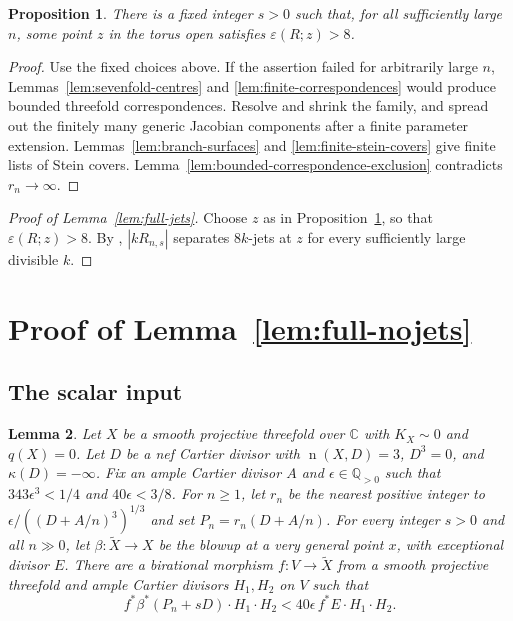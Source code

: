 \documentclass[12pt,a4paper,psamsfonts]{amsart}
\theoremstyle{definition}
\theoremstyle{plain}
\newtheorem{lemma}{Lemma}[section]
\newtheorem{proposition}[lemma]{Proposition}
\newcommand{\Q}{\mathbb Q}
\newcommand{\C}{\mathbb C}
\newcommand{\nef}{\operatorname{n}}
\begin{document}
\begin{proposition}\label{prop:sevenfold-jets}
There is a fixed integer $s>0$ such that, for all sufficiently
large $n$, some point $z$ in the torus open satisfies
$\varepsilon(R;z)>8$.
\end{proposition}
\begin{proof}
Use the fixed choices above. If the assertion failed for arbitrarily
large $n$, Lemmas~\ref{lem:sevenfold-centres} and
\ref{lem:finite-correspondences} would produce bounded threefold
correspondences. Resolve and shrink the family, and spread out
the finitely many generic Jacobian components after a finite
parameter extension. Lemmas~\ref{lem:branch-surfaces} and
\ref{lem:finite-stein-covers} give finite lists of Stein covers.
Lemma~\ref{lem:bounded-correspondence-exclusion} contradicts
$r_n\to\infty$.
\end{proof}


\begin{proof}[Proof of Lemma~\ref{lem:full-jets}]
Choose $z$ as in Proposition~\ref{prop:sevenfold-jets}, so that
$\varepsilon(R;z)>8$. By \cite[Lemma~4.1]{Jets}, $|kR_{n,s}|$
separates $8k$-jets at $z$ for every sufficiently large divisible $k$.
\end{proof}

\section{Proof of Lemma~\ref{lem:full-nojets}}

\subsection{The scalar input}\label{sec:geometric-inputs}

\begin{lemma}\label{lem:full-scalar}
Let $X$ be a smooth projective threefold over $\C$ with
$K_X\sim0$ and $q(X)=0$. Let $D$ be a nef Cartier divisor with
$\nef(X,D)=3$, $D^3=0$, and $\kappa(D)=-\infty$.
Fix an ample Cartier divisor $A$ and $\epsilon\in\Q_{>0}$ such that
$343\epsilon^3<1/4$ and $40\epsilon<3/8$.
For $n\ge1$, let $r_n$ be the nearest positive integer to
$\epsilon/((D+A/n)^3)^{1/3}$ and set $P_n=r_n(D+A/n)$.
For every integer $s>0$ and all $n\gg0$, let $\beta:\widetilde X\to X$
be the blowup at a very general point $x$, with exceptional divisor $E$.
There are a birational morphism $f:V\to\widetilde X$ from a smooth
projective threefold and ample Cartier divisors $H_1,H_2$ on $V$ such that
\[
 f^*\beta^*(P_n+sD)\cdot H_1\cdot H_2
 <40\epsilon\,f^*E\cdot H_1\cdot H_2.
\]
\end{lemma}
\end{document}
